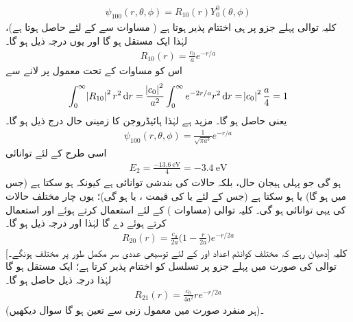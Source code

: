  \begin{align}
\psi_{100}(r,\theta,\phi)=R_{10}(r)Y_{0}^{0}(\theta,\phi) 
\end{align}
 کلیہ توالی پہلے جزو پر ہی اختتام پذیر ہوتا ہے  ( مساوات  سے  کے لئے       حاصل ہوتا ہے)،  لہٰذا   ایک مستقل      ہو گا اور  یوں درجہ ذیل ہو گا۔
   \begin{align}
R_{10}(r)=\frac{c_{0}}{a}e^{-r/a} 
\end{align}
   اس کو مساوات  کے تحت معمول پر لانے  سے
\begin{align*}
\int_{0}^{\infty}\abs{R_{10}}^{2}r^{2}\dif{r}=\frac{\abs{c_0}^{2}}{a^{2}}\int_{0}^{\infty}e^{-2r/a}r^{2}\dif{r}=\abs{c_{0}}^{2}\frac{a}{4}=1 
\end{align*}
یعنی  حاصل ہو گا۔ مزید  ہے لہٰذا  ہائیڈروجن کا زمینی حال درج ذیل ہو گا۔
\begin{align}\label{مساوات_تین_ابعاد_زمینی_ہائیڈروجن}
\psi_{100}(r,\theta,\phi)=\frac{1}{\sqrt{\pi a^{3}}}e^{-r/a} 
\end{align}
اسی طرح  کے لئے توانائی
\begin{align}
E_{2}=\frac{\SI{-13.6}{\electronvolt}}{4}=\SI{-3.4}{\electronvolt}
\end{align}
ہو گی جو پہلی ہیجان حال،  بلکہ  حالات کی بندشی توانائی ہے کیونکہ    ہو سکتا ہے (جس میں  ہو گا) یا  ہو سکتا ہے (جس  کے لئے یا   کی قیمت ،  یا  ہو گی)؛ یوں چار مختلف حالات کی یہی توانائی ہو گی۔
 کلیہ توالی (مساوات )   کے لئے  استعمال کرتے ہوئے  اور  استعمال کرتے ہوئے  دے گا لہٰذا  اور درجہ ذیل ہو گا۔
 \begin{align}\label{مساوات_تین_ابعادی_رداسی_بیس}
R_{20}(r)=\frac{c_{0}}{2a}\big(1-\frac{r}{2a}\big)e^{-r/2a} 
\end{align}
[دھیان رہے کہ مختلف کوانٹم اعداد  اور  کے لئے  توسیعی  عددی سر    مکمل طور پر مختلف ہونگے۔] کلیہ توالی 
     کی صورت میں پہلے جزو پر تسلسل کو اختتام پذیر کرتا ہے؛   ایک مستقل ہو گا  لہٰذا درجہ ذیل حاصل ہو گا۔
   \begin{align}\label{مساوات_تین_ابعادی_رداسی_اکیس}
R_{21}(r)=\frac{c_{0}}{4a^{2}}re^{-r/2a} 
\end{align}
(ہر منفرد صورت میں  معمول زنی سے تعین ہو گا سوال    دیکھیں)۔

